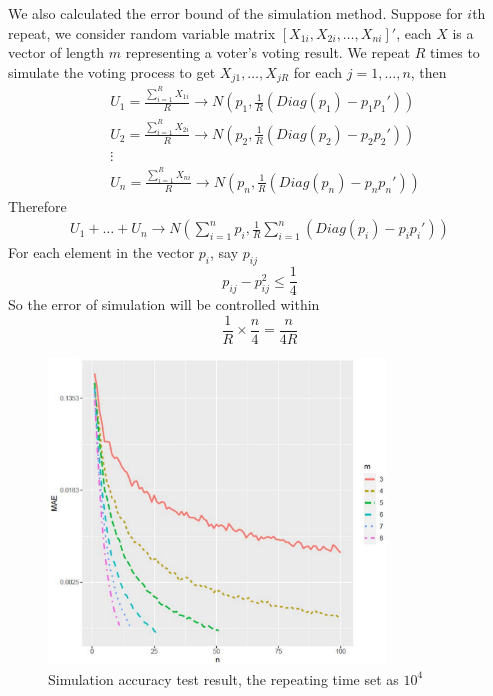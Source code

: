 \documentclass[12pt]{article}
\begin{document}
We also calculated the error bound of the simulation method.
Suppose for $i$th repeat, we consider random variable matrix $[X_{1i},X_{2i},\dots,X_{n i}]'$, each $X$ is a vector of length $m$ representing a voter's voting result. We repeat $R$ times to simulate the voting process to get $X_{j1},\dots,X_{j R}$ for each $j=1,\dots, n$, then
\begin{align*}
        &U_1 = \frac{\sum_{i=1}^{R} X_{1i}}{R} \longrightarrow N\left(p_1,\frac{1}{R}\left(Diag(p_1) - p_1 p_1'\right)\right)\\
        &U_2 = \frac{\sum_{i=1}^{R} X_{2i}}{R} \longrightarrow N\left(p_2,\frac{1}{R}\left(Diag(p_2) - p_2 p_2'\right)\right)\\
        & \vdots\\
        &U_n = \frac{\sum_{i=1}^{R} X_{ni}}{R} \longrightarrow N\left(p_n,\frac{1}{R}\left(Diag(p_n) - p_n p_n'\right)\right)
\end{align*}
Therefore
\begin{align*}
    U_1 + \dots + U_n \longrightarrow N\left(\sum_{i=1}^{n}p_i, \frac{1}{R}\sum_{i=1}^{n}\left(Diag(p_i) - p_i p_i'\right) \right)
\end{align*}
For each element in the vector $p_i$, say $p_{ij}$\\
\begin{equation*}
    p_{ij} - p_{ij}^2 \leq \frac{1}{4}
\end{equation*}
So the error of simulation will be controlled within
\begin{equation*}
    \frac{1}{R} \times \frac{n}{4} = \frac{n}{4R}
\end{equation*}

\begin{figure}%
    \centering
    \includegraphics[width=0.8\textwidth]{simu_accuracy.pdf}
    \caption{Simulation accuracy test result, the repeating time set as $10^4$}
\end{figure}
\end{document}
